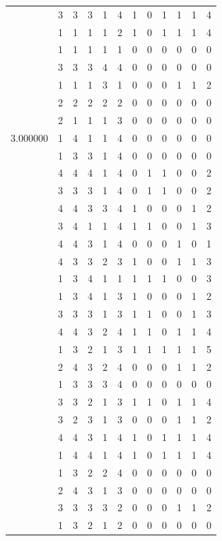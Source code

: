 \documentclass[]{book}
\theoremstyle{definition}
\theoremstyle{definition}
\theoremstyle{definition}
\theoremstyle{remark}
\begin{document}
\begin{table}
{\begin{tabular}[t]{rrrrrrrrrrrr}
 & 3 & 3 & 3 & 1 & 4 & 1 & 0 & 1 & 1 & 1 & 4\\
 & 1 & 1 & 1 & 1 & 2 & 1 & 0 & 1 & 1 & 1 & 4\\
 & 1 & 1 & 1 & 1 & 1 & 0 & 0 & 0 & 0 & 0 & 0\\
 & 3 & 3 & 3 & 4 & 4 & 0 & 0 & 0 & 0 & 0 & 0\\
 & 1 & 1 & 1 & 3 & 1 & 0 & 0 & 0 & 1 & 1 & 2\\
 & 2 & 2 & 2 & 2 & 2 & 0 & 0 & 0 & 0 & 0 & 0\\
 & 2 & 1 & 1 & 1 & 3 & 0 & 0 & 0 & 0 & 0 & 0\\
3.000000 & 1 & 4 & 1 & 1 & 4 & 0 & 0 & 0 & 0 & 0 & 0\\
 & 1 & 3 & 3 & 1 & 4 & 0 & 0 & 0 & 0 & 0 & 0\\
 & 4 & 4 & 4 & 1 & 4 & 0 & 1 & 1 & 0 & 0 & 2\\
 & 3 & 3 & 3 & 1 & 4 & 0 & 1 & 1 & 0 & 0 & 2\\
 & 4 & 4 & 3 & 3 & 4 & 1 & 0 & 0 & 0 & 1 & 2\\
 & 3 & 4 & 1 & 1 & 4 & 1 & 1 & 0 & 0 & 1 & 3\\
 & 4 & 4 & 3 & 1 & 4 & 0 & 0 & 0 & 1 & 0 & 1\\
 & 4 & 3 & 3 & 2 & 3 & 1 & 0 & 0 & 1 & 1 & 3\\
 & 1 & 3 & 4 & 1 & 1 & 1 & 1 & 1 & 0 & 0 & 3\\
 & 1 & 3 & 4 & 1 & 3 & 1 & 0 & 0 & 0 & 1 & 2\\
 & 3 & 3 & 3 & 1 & 3 & 1 & 1 & 0 & 0 & 1 & 3\\
 & 4 & 4 & 3 & 2 & 4 & 1 & 1 & 0 & 1 & 1 & 4\\
 & 1 & 3 & 2 & 1 & 3 & 1 & 1 & 1 & 1 & 1 & 5\\
 & 2 & 4 & 3 & 2 & 4 & 0 & 0 & 0 & 1 & 1 & 2\\
 & 1 & 3 & 3 & 3 & 4 & 0 & 0 & 0 & 0 & 0 & 0\\
 & 3 & 3 & 2 & 1 & 3 & 1 & 1 & 0 & 1 & 1 & 4\\
 & 3 & 2 & 3 & 1 & 3 & 0 & 0 & 0 & 1 & 1 & 2\\
 & 4 & 4 & 3 & 1 & 4 & 1 & 0 & 1 & 1 & 1 & 4\\
 & 1 & 4 & 4 & 1 & 4 & 1 & 0 & 1 & 1 & 1 & 4\\
 & 1 & 3 & 2 & 2 & 4 & 0 & 0 & 0 & 0 & 0 & 0\\
 & 2 & 4 & 3 & 1 & 3 & 0 & 0 & 0 & 0 & 0 & 0\\
 & 3 & 3 & 3 & 3 & 2 & 0 & 0 & 0 & 1 & 1 & 2\\
 & 1 & 3 & 2 & 1 & 2 & 0 & 0 & 0 & 0 & 0 & 0\\

\end{tabular}}
\end{table}
\end{document}
